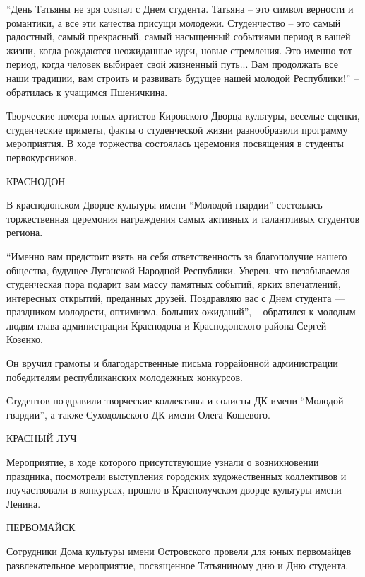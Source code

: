 
\enquote{День Татьяны не зря совпал с Днем студента. Татьяна – это символ верности и
романтики, а все эти качества присущи молодежи. Студенчество – это самый
радостный, самый прекрасный, самый насыщенный событиями период в вашей жизни,
когда рождаются неожиданные идеи, новые стремления. Это именно тот период,
когда человек выбирает свой жизненный путь... Вам продолжать все наши традиции,
вам строить и развивать будущее нашей молодой Республики!} – обратилась к
учащимся Пшеничкина.


Творческие номера юных артистов Кировского Дворца культуры, веселые сценки,
студенческие приметы, факты о студенческой жизни разнообразили программу
мероприятия. В ходе торжества состоялась церемония посвящения в студенты
первокурсников.

КРАСНОДОН

В краснодонском Дворце культуры имени \enquote{Молодой гвардии} состоялась
торжественная церемония награждения самых активных и талантливых студентов
региона.

\enquote{Именно вам предстоит взять на себя ответственность за благополучие нашего
общества, будущее Луганской Народной Республики. Уверен, что незабываемая
студенческая пора подарит вам массу памятных событий, ярких впечатлений,
интересных открытий, преданных друзей. Поздравляю вас с Днем студента —
праздником молодости, оптимизма, больших ожиданий}, – обратился к молодым людям
глава администрации Краснодона и Краснодонского района Сергей Козенко.


Он вручил грамоты и благодарственные письма горрайонной администрации
победителям республиканских молодежных конкурсов.  

Студентов поздравили творческие коллективы и солисты ДК имени \enquote{Молодой
гвардии}, а также Суходольского ДК имени Олега Кошевого.

КРАСНЫЙ ЛУЧ

Мероприятие, в ходе которого присутствующие узнали о возникновении праздника,
посмотрели выступления городских художественных коллективов и поучаствовали в
конкурсах, прошло в Краснолучском дворце культуры имени Ленина.

ПЕРВОМАЙСК

Сотрудники Дома культуры имени Островского провели для юных первомайцев
развлекательное мероприятие, посвященное Татьяниному дню и Дню студента.

